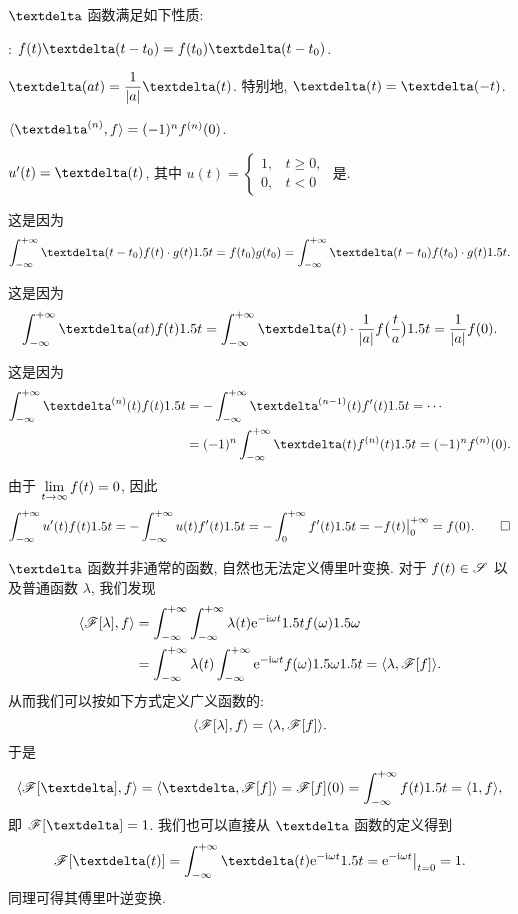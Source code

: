 \begin{theorem}
  $\dirac$ 函数满足如下性质:
  \begin{enuma}
    \item {}: $f(t)\dirac(t-t_0)=f(t_0)\dirac(t-t_0)$.
    \smallskip
    \item $\dirac(at)=\dfrac1{\abs{a}}\dirac(t)$. 特别地, $\dirac(t)=\dirac(-t)$.
    \item $\pair{\dirac^{(n)},f}=(-1)^nf^{(n)}(0)$.
    \item $u'(t)=\dirac(t)$, 其中 $u(t)=\begin{cases}1,&t\ge0,\\0,&t<0\end{cases}$ 是\footnotemark.
  \end{enuma}
\end{theorem}

\begin{proofenuma}
  \item 这是因为
  \[
    \intff \dirac(t-t_0)f(t)\cdot g(t)\d t=f(t_0)g(t_0)
    =\intff \dirac(t-t_0)f(t_0)\cdot g(t)\d t.
  \]
  \item 这是因为
  \[
    \intff \dirac(at)f(t)\d t
    =\intff \dirac(t)\cdot \frac1{\abs{a}}f\bigl(\frac ta\bigr)\d t
    =\frac1{\abs{a}}f(0).
  \]
  \item 这是因为
  \begin{align*}
    \intff \dirac^{(n)}(t)f(t)\d t
    &=-\intff \dirac^{(n-1)}(t)f'(t)\d t
    =\cdots\\
    &=(-1)^n\intff \dirac(t)f^{(n)}(t)\d t
    =(-1)^nf^{(n)}(0).
  \end{align*}
  \item 由于 $\lim\limits_{t\rightarrow\infty}f(t)=0$, 因此
  \[
    \displaystyle\int_{-\infty}^{+\infty} u'(t)f(t)1.5 t
    =-\displaystyle\int_{-\infty}^{+\infty} u(t)f'(t)1.5 t
    =-\displaystyle\int_0^{+\infty} f'(t)1.5 t
    =-f(t)\big|_0^{+\infty}
    =f(0).\qedhere
  \]
\end{proofenuma}

$\dirac$ 函数并非通常的函数, 自然也无法定义傅里叶变换.
对于 $f(t)\in\mathscr{S}$ 以及普通函数 $\lambda$, 我们发现
\begin{align*}
  \langle{\mathscr{F}[\lambda],f}\rangle&
  =\displaystyle\int_{-\infty}^{+\infty}\displaystyle\int_{-\infty}^{+\infty} \lambda(t)\mathrm{e}^{-\mathrm{i} \omega t}1.5 t f(\omega)1.5 \omega\\&
  =\displaystyle\int_{-\infty}^{+\infty}\lambda(t) \displaystyle\int_{-\infty}^{+\infty} \mathrm{e}^{-\mathrm{i} \omega t}f(\omega)1.5 \omega1.5 t 
  =\langle{\lambda,\mathscr{F}[f]}\rangle.
\end{align*}
从而我们可以按如下方式定义广义函数的:
\[
  \langle{\mathscr{F}[\lambda],f}\rangle=\langle{\lambda,\mathscr{F}[f]}\rangle.
\]
于是
\[
  \pair{\msf[\dirac],f}
  =\pair{\dirac,\msf[f]}
  =\msf[f](0)
  =\intff f(t)\d t=\pair{1,f},
\]
即 $\msf[\dirac]=1$.
我们也可以直接从 $\dirac$ 函数的定义得到
\[
  \msf[\dirac(t)]
  =\intff \dirac(t)\ee^{-\ii \omega t}\d t
  =\ee^{-\ii \omega t}\big|_{t=0}
  =1.
\]
同理可得其傅里叶逆变换.

